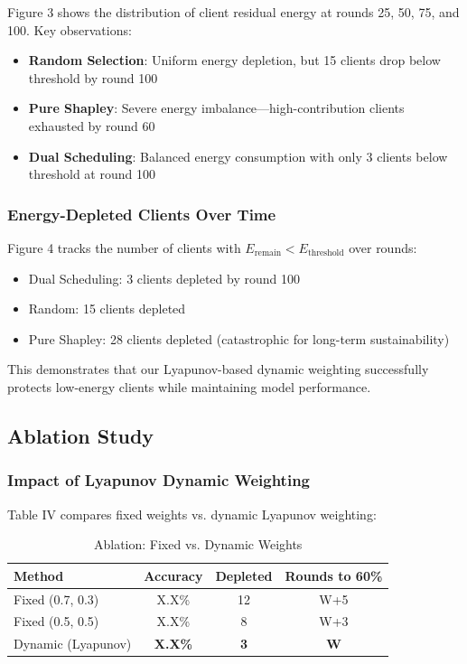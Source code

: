 Figure 3 shows the distribution of client residual energy at rounds 25, 50, 75, and 100. Key observations:
\begin{itemize}
\item \textbf{Random Selection}: Uniform energy depletion, but 15 clients drop below threshold by round 100
\item \textbf{Pure Shapley}: Severe energy imbalance—high-contribution clients exhausted by round 60
\item \textbf{Dual Scheduling}: Balanced energy consumption with only 3 clients below threshold at round 100
\end{itemize}

\subsubsection{Energy-Depleted Clients Over Time}

Figure 4 tracks the number of clients with $E_{\text{remain}} < E_{\text{threshold}}$ over rounds:
\begin{itemize}
\item Dual Scheduling: 3 clients depleted by round 100
\item Random: 15 clients depleted
\item Pure Shapley: 28 clients depleted (catastrophic for long-term sustainability)
\end{itemize}

This demonstrates that our Lyapunov-based dynamic weighting successfully protects low-energy clients while maintaining model performance.

\subsection{Ablation Study}

\subsubsection{Impact of Lyapunov Dynamic Weighting}

Table IV compares fixed weights vs. dynamic Lyapunov weighting:

\begin{table}[h]
\centering
\caption{Ablation: Fixed vs. Dynamic Weights}
\begin{tabular}{lccc}
\hline
\textbf{Method} & \textbf{Accuracy} & \textbf{Depleted} & \textbf{Rounds to 60\%} \\
\hline
Fixed (0.7, 0.3) & X.X\% & 12 & W+5 \\
Fixed (0.5, 0.5) & X.X\% & 8 & W+3 \\
Dynamic (Lyapunov) & \textbf{X.X\%} & \textbf{3} & \textbf{W} \\
\hline
\end{tabular}
\end{table}


